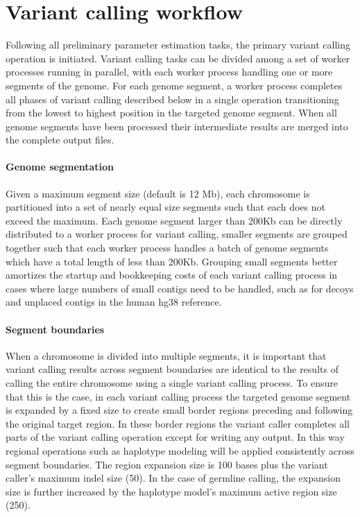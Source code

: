 \documentclass{article}
\begin{document}
\section{Variant calling workflow}

Following all preliminary parameter estimation tasks, the primary variant calling operation is initiated. Variant calling tasks can be divided among a set of worker processes running in parallel, with each worker process handling one or more segments of the genome. For each genome segment, a worker process completes all phases of variant calling described below in a single operation transitioning from the lowest to highest position in the targeted genome segment. When all genome segments have been processed their intermediate results are merged into the complete output files.

\paragraph{Genome segmentation} Given a maximum segment size (default is 12 Mb), each chromosome is partitioned into a set of nearly equal size segments such that each does not exceed the maximum. Each genome segment larger than 200Kb can be directly distributed to a worker process for variant calling, smaller segments are grouped together such that each worker process handles a batch of genome segments which have a total length of less than 200Kb. Grouping small segments better amortizes the startup and bookkeeping costs of each variant calling process in cases where large numbers of small contigs need to be handled, such as for decoys and unplaced contigs in the human hg38 reference.

\paragraph{Segment boundaries} When a chromosome is divided into multiple segments, it is important that variant calling results across segment boundaries are identical to the results of calling the entire chromosome using a single variant calling process. To ensure that this is the case, in each variant calling process the targeted genome segment is expanded by a fixed size to create small border regions preceding and following the original target region. In these border regions the variant caller completes all parts of the variant calling operation except for writing any output. In this way regional operations such as haplotype modeling will be applied consistently across segment boundaries. The region expansion size is 100 bases plus the variant caller's maximum indel size (50). In the case of germline calling, the expansion size is further increased by the haplotype model's maximum active region size (250).
\end{document}
